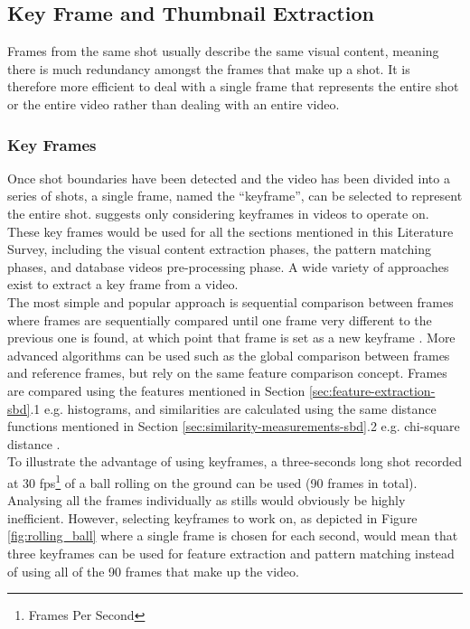
\subsection{Key Frame and Thumbnail Extraction}

Frames from the same shot usually describe the same visual content, meaning there is much redundancy amongst the frames that make up a shot. It is therefore more efficient to deal with a single frame that represents the entire shot or the entire video rather than dealing with an entire video.

\subsubsection{Key Frames}

Once shot boundaries have been detected and the video has been divided into a series of shots, a single frame, named the ``keyframe'', can be selected to represent the entire shot. \cite{heo2016colortransfer} suggests only considering keyframes in videos to operate on. These key frames would be used for all the sections mentioned in this Literature Survey, including the visual content extraction phases, the pattern matching phases, and database videos pre-processing phase. A wide variety of approaches exist to extract a key frame from a video.\\

The most simple and popular approach is sequential comparison between frames where frames are sequentially compared until one frame very different to the previous one is found, at which point that frame is set as a new keyframe \cite{heo2016colortransfer}. More advanced algorithms can be used such as the global comparison between frames and reference frames, but rely on the same feature comparison concept. Frames are compared using the features mentioned in Section \ref{sec:feature-extraction-sbd}.1 e.g. histograms, and similarities are calculated using the same distance functions mentioned in Section \ref{sec:similarity-measurements-sbd}.2 e.g. chi-square distance \cite{hu2011survey}.\\

To illustrate the advantage of using keyframes, a three-seconds long shot recorded at 30 fps\footnote{Frames Per Second} of a ball rolling on the ground can be used (90 frames in total). Analysing all the frames individually as stills would obviously be highly inefficient. However, selecting keyframes to work on, as depicted in Figure \ref{fig:rolling_ball} where a single frame is chosen for each second, would mean that three keyframes can be used for feature extraction and pattern matching instead of using all of the 90 frames that make up the video.\\

